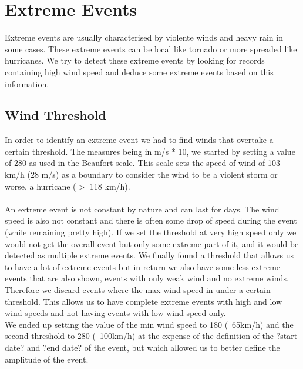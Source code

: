 \section{Extreme Events}
\noindent
Extreme events are usually characterised by violente winds and heavy rain in some cases. These extreme events can be local like tornado or more spreaded like hurricanes. We try to detect these extreme events by looking for records containing high wind speed and deduce some extreme events based on this  information.

\subsection{Wind Threshold}
In order to identify an extreme event we had to find winds that overtake a certain threshold. The measures being in m/s * 10, we started by setting a value of 280 as used in the \href{http://en.wikipedia.org/wiki/Beaufort_scale}{Beaufort scale}. This scale sets the speed of wind of 103 km/h (28 m/s) as a boundary to consider the wind to be a violent storm or worse, a hurricane ($>$ 118 km/h).\\
\\
An extreme event is not constant by nature and can last for days. The wind speed is also not constant and there is often some drop of speed during the event (while remaining pretty high). If we set the threshold at very high speed only we would not get the overall event but only some extreme part of it, and it would be detected as multiple extreme events. We finally found a threshold that allows us to have a lot of extreme events but in return we also have some less extreme events that are also shown, events with only weak wind and no extreme winds. Therefore we discard events where the max wind speed in under a certain threshold. This allows us to have complete extreme events with high and low wind speeds and not having events with low wind speed only.\\
We ended up setting the value of the min wind speed to 180 (~65km/h) and the second threshold to 280 (~100km/h) at the expense of the definition of the ?start date? and ?end date? of the event, but which allowed us to better define the amplitude of the event.

